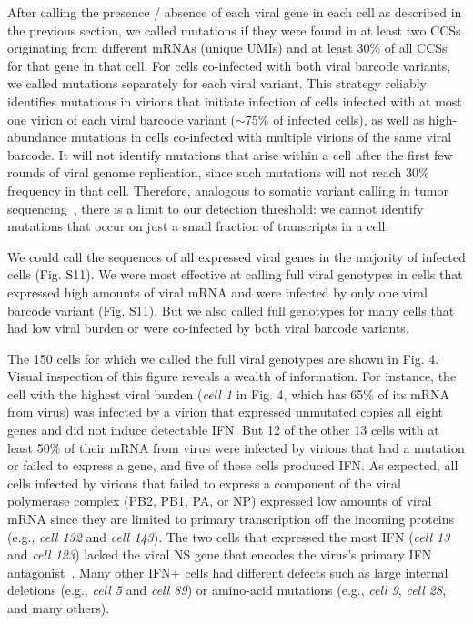 \documentclass[]{article}
\begin{document}
After calling the presence / absence of each viral gene in each cell as described in the previous section, we called mutations if they were found in at least two CCSs originating from different mRNAs (unique UMIs) and at least 30\% of all CCSs for that gene in that cell.
For cells co-infected with both viral barcode variants, we called mutations separately for each viral variant.
This strategy reliably identifies mutations in virions that initiate infection of cells infected with at most one virion of each viral barcode variant ($\sim$75\% of infected cells), as well as high-abundance mutations in cells co-infected with multiple virions of the same viral barcode.
It will not identify mutations that arise within a cell after the first few rounds of viral genome replication, since such mutations will not reach 30\% frequency in that cell.
Therefore, analogous to somatic variant calling in tumor sequencing~\cite{xu2014comparison, cibulskis2013sensitive}, there is a limit to our detection threshold: we cannot identify mutations that occur on just a small fraction of transcripts in a cell. 

We could call the sequences of all expressed viral genes in the majority of infected cells (Fig. S11).
We were most effective at calling full viral genotypes in cells that expressed high amounts of viral mRNA and were infected by only one viral barcode variant (Fig. S11).
But we also called full genotypes for many cells that had low viral burden or were co-infected by both viral barcode variants.

The 150 cells for which we called the full viral genotypes are shown in Fig. 4.
Visual inspection of this figure reveals a wealth of information.
For instance, the cell with the highest viral burden (\textit{cell 1} in Fig. 4, which has 65\% of its mRNA from virus) was infected by a virion that expressed unmutated copies all eight genes and did not induce detectable IFN.
But 12 of the other 13 cells with at least 50\% of their mRNA from virus were infected by virions that had a mutation or failed to express a gene, and five of these cells produced IFN.
As expected, all cells infected by virions that failed to express a component of the viral polymerase complex (PB2, PB1, PA, or NP) expressed low amounts of viral mRNA since they are limited to primary transcription off the incoming proteins (e.g., \textit{cell 132} and \textit{cell 143}).
The two cells that expressed the most IFN (\textit{cell 13} and \textit{cell 123}) lacked the viral NS gene that encodes the virus's primary IFN antagonist~\cite{garcia1998influenza, hale2008multifunctional}.
Many other IFN+ cells had different defects such as large internal deletions (e.g., \textit{cell 5} and \textit{cell 89}) or amino-acid mutations (e.g., \textit{cell 9}, \textit{cell 28}, and many others).
\end{document}
